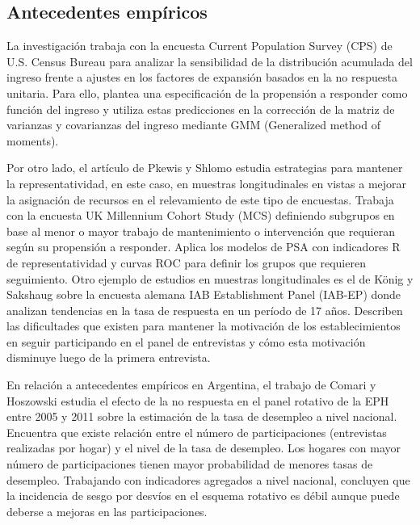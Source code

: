 \documentclass{article}
\begin{document}
\subsection{Antecedentes empíricos}

La investigación \cite{korinek07} trabaja con la encuesta Current Population Survey (CPS) de U.S. Census Bureau para analizar la sensibilidad de la distribución acumulada del ingreso frente a ajustes en los factores de expansión basados en la no respuesta unitaria. Para ello, plantea una especificación de la propensión a responder como función del ingreso y utiliza estas predicciones en la corrección de la matriz de varianzas y covarianzas del ingreso mediante GMM (Generalized method of moments). 

Por otro lado, el artículo de Pkewis y Shlomo \cite{longitudinal-non-response} estudia estrategias para mantener la representatividad, en este caso, en muestras longitudinales en vistas a mejorar la asignación de recursos en el relevamiento de este tipo de encuestas. Trabaja con la encuesta UK Millennium Cohort Study (MCS) definiendo subgrupos en base al menor o mayor trabajo de mantenimiento o intervención que requieran según su propensión a responder. Aplica los modelos de PSA con indicadores R de representatividad y curvas ROC para definir los grupos que requieren seguimiento. Otro ejemplo de estudios en muestras longitudinales es el de König y Sakshaug \cite{longitudinal-empresas} sobre la encuesta alemana IAB Establishment Panel (IAB-EP) donde analizan tendencias en la tasa de respuesta en un período de 17 años. Describen las dificultades que existen para mantener la motivación de los establecimientos en seguir participando en el panel de entrevistas y cómo esta motivación disminuye luego de la primera entrevista.  

En relación a antecedentes empíricos en Argentina, el trabajo de Comari y Hoszowski \cite{nonresponsearg} estudia el efecto de la no respuesta en el panel rotativo de la EPH entre 2005 y 2011 sobre la estimación de la tasa de desempleo a nivel nacional. Encuentra que existe relación entre el número de participaciones (entrevistas realizadas por hogar) y el nivel de la tasa de desempleo. Los hogares con mayor número de participaciones tienen mayor probabilidad de menores tasas de desempleo. Trabajando con indicadores agregados a nivel nacional, concluyen que la incidencia de sesgo por desvíos en el esquema rotativo es débil aunque puede deberse a mejoras en las participaciones.
\end{document}
